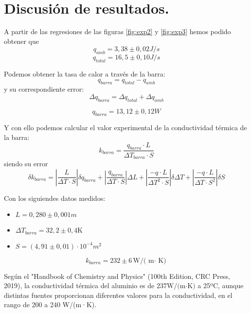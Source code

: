 \documentclass[a4paper,12pt,spanish]{article}
\begin{document}
	
	\section{Discusión de resultados.}
	
	\iffalse
	Respuesta razonada a las cuestiones que aparecen en el
	guion de la práctica. Justificación de los resultados. Comparativa de los valores
	experimentales obtenidos con los publicados en la literatura y posibles fuentes de
	incertidumbre en la experimentación que expliquen la discrepancia.
	
	Básicamente comentar los resultados y lo similares que son a lo esperado, comentar las posibles causas de error.
	\fi
	
	A partir de las regresiones de las figuras \ref{fig:exp2} y \ref{fig:exp3} hemos podido obtener que
	\[ q_{amb} = 3,38 \pm 0,02 \si{J/s}
	\]
	\[ q_{total} = 16,5 \pm 0,10\si{J/s}
	\]
	
	Podemos obtener la tasa de calor a través de la barra:
	\[ q_{barra} = q_{total} - q_{amb}
	\]
	y su correspondiente error:
	\[\Delta q_{barra} =\Delta q_{total} + \Delta q_{amb}
	\]
	
	\[\boxed{q_{barra} = 13,12 \pm 0,12 \si{W}}
	\]
	
	Y con ello podemos calcular el valor experimental de la conductividad térmica de la barra:
	\[k_{barra} = \frac{q_{barra}\cdot L}{\Delta T_{barra}\cdot S}
	\]
	siendo su error
	\[\delta k_{barra} = \left|\frac{L}{\Delta T\cdot S}\right|\delta q_{barra} + \left| \frac{q_{barra}}{\Delta T \cdot S} \right|\Delta L +  \left| \frac{-q\cdot L}{\Delta T^2 \cdot S} \right| \delta \Delta T + \left| \frac{-q\cdot L}{\Delta T\cdot S^2} \right| \delta S   \] 
	
	Con los siguiendes datos medidos:
	\begin{itemize}
		\item $L= 0,280 \pm 0,001\si{m}$
		\item $\Delta T_{barra}= 32,2\pm 0,4 \text{K}$
		\item $S = (4,91\pm 0,01)\cdot10^{-4} \si{m^2}$
	\end{itemize}
	
	
	\[ \boxed{k_{barra} = 232 \pm 6  \text{W/( m$\cdot$ K)}     }
	\]
	
	
	Según el "Handbook of Chemistry and Physics" (100th Edition, CRC Press, 2019), la conductividad térmica del aluminio es de $237 \text{W/(m·K)}$ a 25ºC, aunque distintas fuentes proporcionan diferentes valores para la conductividad, en el rango de 200 a 240 W/(m·K).
	
\end{document}
